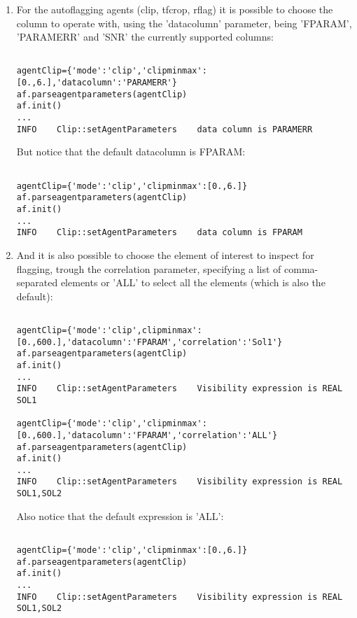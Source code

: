 \begin{enumerate}

\item For the autoflagging agents (clip, tfcrop, rflag) it is possible to
choose the column to operate with, using the 'datacolumn' parameter, being 'FPARAM',
'PARAMERR' and 'SNR' the currently supported columns:

\begin{verbatim}

agentClip={'mode':'clip','clipminmax':[0.,6.],'datacolumn':'PARAMERR'}
af.parseagentparameters(agentClip)
af.init()
...
INFO	Clip::setAgentParameters	data column is PARAMERR

\end{verbatim}

But notice that the default datacolumn is FPARAM:

\begin{verbatim}

agentClip={'mode':'clip','clipminmax':[0.,6.]}
af.parseagentparameters(agentClip)
af.init()
...
INFO	Clip::setAgentParameters	data column is FPARAM

\end{verbatim}

\item And it is also possible to choose the element of interest to inspect for
flagging, trough the correlation parameter, specifying a list of comma-separated
elements or 'ALL' to select all the elements (which is also the default):

\begin{verbatim}

agentClip={'mode':'clip',clipminmax':[0.,600.],'datacolumn':'FPARAM','correlation':'Sol1'}
af.parseagentparameters(agentClip)
af.init()
...
INFO	Clip::setAgentParameters	Visibility expression is REAL SOL1

agentClip={'mode':'clip','clipminmax':[0.,600.],'datacolumn':'FPARAM','correlation':'ALL'}
af.parseagentparameters(agentClip)
af.init()
...
INFO	Clip::setAgentParameters	Visibility expression is REAL SOL1,SOL2

\end{verbatim}

Also notice that the default expression is 'ALL':

\begin{verbatim}

agentClip={'mode':'clip','clipminmax':[0.,6.]}
af.parseagentparameters(agentClip)
af.init()
...
INFO	Clip::setAgentParameters	Visibility expression is REAL SOL1,SOL2

\end{verbatim}

\end{enumerate}

